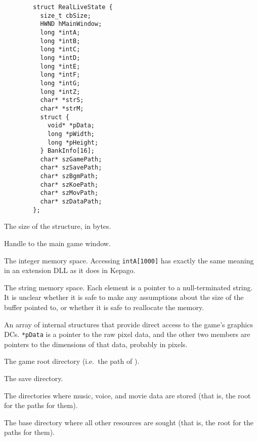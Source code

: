       \begin{lstlisting}
        struct RealLiveState {
          size_t cbSize;
          HWND hMainWindow;
          long *intA;
          long *intB;
          long *intC;
          long *intD;
          long *intE;
          long *intF;
          long *intG;
          long *intZ;
          char* *strS;
          char* *strM;
          struct {
            void* *pData;
            long *pWidth;
            long *pHeight;
          } BankInfo[16];
          char* szGamePath;
          char* szSavePath;
          char* szBgmPath;
          char* szKoePath;
          char* szMovPath;
          char* szDataPath;
        };
      \end{lstlisting}
      \noindent
      \begin{nicelist}
      \item[\lstinline|dwSize|]
        The size of the structure, in bytes.
      \item[\lstinline|hMainWindow|]
        Handle to the main game window.
      \item[\lstinline|*intA .. *intZ|]
        The integer memory space.  Accessing \lstinline|intA[1000]| has exactly 
        the same meaning in an extension DLL as it does in Kepago.
      \item[\lstinline|*strS|, \lstinline|*strM|]
        The string memory space.  Each element is a pointer to a null-terminated 
        string.  It is unclear whether it is safe to make any assumptions about 
        the size of the buffer pointed to, or whether it is safe to reallocate 
        the memory.
      \item[\lstinline|BankInfo|]
        An array of internal structures that provide direct access to the game's
        graphics DCs.  \lstinline|*pData| is a pointer to the raw pixel data,
        and the other two members are pointers to the dimensions of that data,
        probably in pixels.
      \item[\lstinline|szGamePath|]
        The game root directory (i.e.\ the path of \gameexe).
      \item[\lstinline|szSavePath|]
        The save directory.
      \item[\lstinline|szBgmPath|, \lstinline|szKoePath|, \lstinline|szMovPath|]
        The directories where music, voice, and movie data are stored (that is,
        the root for the  paths for them).
      \item[\lstinline|szDataPath|]
        The base directory where all other resources are sought (that is,
        the root for the  paths for them).
      \end{nicelist}
        
\lstset{language=kepago}
